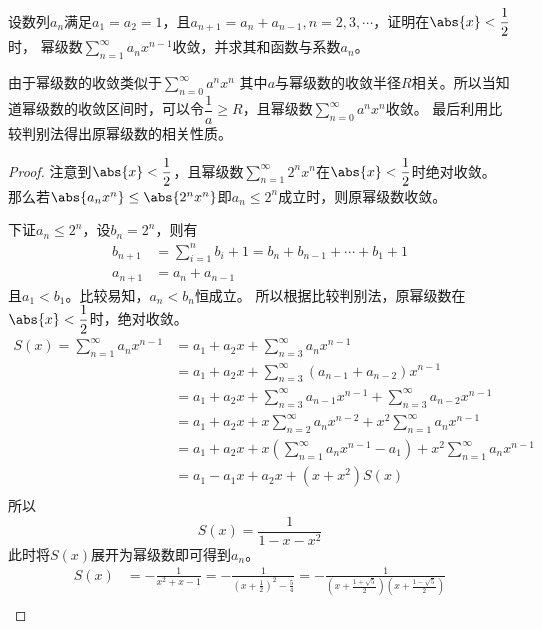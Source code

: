 \begin{example}
    设数列${a_n}$满足$a_1=a_2=1$，且$a_{n+1}=a_n+a_{n-1}, n=2,3,\cdots$，证明在$\abs{x}<\dfrac{1}{2}$时，
    幂级数$\displaystyle\sum_{n=1}^\infty a_nx^{n-1}$收敛，并求其和函数与系数$a_n$。
\end{example}
由于幂级数的收敛类似于$\displaystyle\sum_{n=0}^\infty a^nx^n$
其中$a$与幂级数的收敛半径$R$相关。所以当知道幂级数的收敛区间时，可以令$\dfrac{1}{a}\geq R$，且幂级数$\displaystyle\sum_{n=0}^\infty a^nx^n$收敛。
最后利用比较判别法得出原幂级数的相关性质。
\begin{proof}
    注意到$\abs{x}<\dfrac{1}{2}$，且幂级数$\displaystyle\sum_{n=1}^\infty 2^nx^n$在$\abs{x}<\dfrac{1}{2}$时绝对收敛。
    那么若$\abs{a_n x^n} \leq \abs{2^n x^n}$即$a_n\leq 2^n$成立时，则原幂级数收敛。

    下证$a_n\leq 2^n$，设$b_n=2^n$，则有
    \begin{align*}
        b_{n+1} & = \sum_{i=1}^{n}b_i +1 = b_n + b_{n-1} + \cdots + b_1 + 1 \\
        a_{n+1} & = a_{n} + a_{n-1}
    \end{align*}
    且$a_1 < b_1$。比较易知，$a_{n}<b_{n}$恒成立。
    所以根据比较判别法，原幂级数在$\abs{x}<\dfrac{1}{2}$时，绝对收敛。
    \begin{align*}
        S(x) = \sum_{n=1}^\infty a_nx^{n-1}
         & = a_1 + a_2x + \sum_{n=3}^\infty a_nx^{n-1}                                          \\
         & = a_1 +a_2x +\sum_{n=3}^\infty (a_{n-1}+a_{n-2})x^{n-1}                              \\
         & = a_1 +a_2x +\sum_{n=3}^\infty a_{n-1}x^{n-1} + \sum_{n=3}^\infty a_{n-2}x^{n-1}     \\
         & = a_1 +a_2x +x\sum_{n=2}^\infty a_nx^{n-2} + x^2\sum_{n=1}^\infty a_nx^{n-1}         \\
         & = a_1 +a_2x +x(\sum_{n=1}^\infty a_nx^{n-1} - a_1) + x^2\sum_{n=1}^\infty a_nx^{n-1} \\
         & = a_1 - a_1x +a_2x + (x + x^2)S(x)                                                   \\
    \end{align*}
    所以
    \[ S(x) = \frac{1}{1-x-x^2} \]
    此时将$S(x)$展开为幂级数即可得到$a_n$。
    \begin{align*}
        S(x)
         &
        = -\frac{1}{x^2+x-1}
        = -\frac{1}{\left(x+\frac{1}{2}\right)^2-\frac{5}{4}}
        = -\frac{1}{\left(x+\frac{1+\sqrt{5}}{2}\right)\left(x+\frac{1-\sqrt{5}}{2}\right)}                                                                   \\

\end{align*}
\end{proof}

